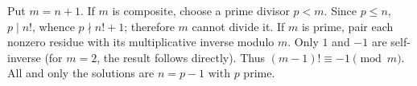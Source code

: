 Put $m=n+1$. If $m$ is composite, choose a prime divisor $p<m$. Since $p\le n$, $p\mid n!$, whence $p\nmid n!+1$; therefore $m$ cannot divide it. If $m$ is prime, pair each nonzero residue with its multiplicative inverse modulo $m$. Only $1$ and $-1$ are self-inverse (for $m=2$, the result follows directly). Thus $(m-1)!\equiv-1\pmod m$. All and only the solutions are $\boxed{n=p-1\text{ with }p\text{ prime}}$.
